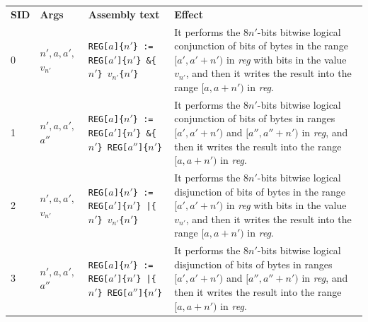 \documentclass[10pt,twocolumn]{article}
\begin{document}
\begin{table}[!h]
\begin{center}
\def\arraystretch{1.5}
\begin{tabular}{lp{1.2cm}p{5.5cm}p{7.5cm}}
\textbf{SID} & \textbf{Args} & \textbf{Assembly text} & \textbf{Effect}
\\

0 & $ n',a,a',$ \newline $ v_{n'} $ %
& \texttt{REG[}$ a $\texttt{]\{}$ n' $\texttt{\} := REG[}$ a' $\texttt{]\{}$
n' $\texttt{\} \&\{}$ n' $\texttt{\} }$ v_{n'} $\texttt{\{}$ n' $\texttt{\}}
%
& It performs the $ 8n' $-bits bitwise logical conjunction of bits of bytes in
the range $ [a',a'+n') $ in \textit{reg} with bits in the value $ v_{n'} $, and
then it writes the result into the range $ [a,a+n') $ in \textit{reg}. \\

1 & $ n',a,a',$ \newline $ a'' $ %
& \texttt{REG[}$ a $\texttt{]\{}$ n' $\texttt{\} := REG[}$ a' $\texttt{]\{}$
n' $\texttt{\} \&\{}$ n' $\texttt{\} REG[}$ a'' $\texttt{]\{}$ n'
$\texttt{\}} %
& It performs the $ 8n' $-bits bitwise logical conjunction of bits of bytes in
ranges $ [a',a'+n') $ and $ [a'',a''+n') $ in \textit{reg}, and then it writes
the result into the range $ [a,a+n') $ in \textit{reg}. \\

2 & $ n',a,a',$ \newline $ v_{n'} $ %
& \texttt{REG[}$ a $\texttt{]\{}$ n' $\texttt{\} := REG[}$ a' $\texttt{]\{}$
n' $\texttt{\} |\{}$ n' $\texttt{\} }$ v_{n'} $\texttt{\{}$ n' $\texttt{\}}
%
& It performs the $ 8n' $-bits bitwise logical disjunction of bits of bytes in
the range $ [a',a'+n') $ in \textit{reg} with bits in the value $ v_{n'} $, and
then it writes the result into the range $ [a,a+n') $ in \textit{reg}. \\

3 & $ n',a,a',$ \newline $ a'' $ %
& \texttt{REG[}$ a $\texttt{]\{}$ n' $\texttt{\} := REG[}$ a' $\texttt{]\{}$
n' $\texttt{\} |\{}$ n' $\texttt{\} REG[}$ a'' $\texttt{]\{}$ n'
$\texttt{\}} %
& It performs the $ 8n' $-bits bitwise logical disjunction of bits of bytes in
ranges $ [a',a'+n') $ and $ [a'',a''+n') $ in \textit{reg}, and then it writes
the result into the range $ [a,a+n') $ in \textit{reg}. \\


\end{tabular}
\end{center}
\end{table}
\end{document}
